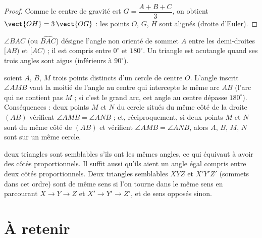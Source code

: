 \documentclass[11pt]{article}
\begin{document}
\begin{proof}
Comme le centre de gravité est $G=\dfrac{A+B+C}{3}$, on obtient $\vect{OH}=3\,\vect{OG}$ : les points $O$, $G$, $H$ sont alignés (droite d'Euler).
\end{proof}

\begin{definition}[Angles]\label{def:angles}
$\angle BAC$ (ou $\widehat{BAC}$) désigne l'angle non orienté de sommet $A$ entre les demi-droites $[AB)$ et $[AC)$ ; il est compris entre $0^\circ$ et $180^\circ$. Un triangle est acutangle quand ses trois angles sont aigus (inférieurs à $90^\circ$).
\end{definition}

\begin{theoreme}\label{thm:angle-inscrit}
soient $A$, $B$, $M$ trois points distincts d'un cercle de centre $O$. L'angle inscrit $\angle AMB$ vaut la moitié de l'angle au centre qui intercepte le même arc $AB$ (l'arc qui ne contient pas $M$ ; si c'est le grand arc, cet angle au centre dépasse $180^\circ$). Conséquences : deux points $M$ et $N$ du cercle situés du même côté de la droite $(AB)$ vérifient $\angle AMB=\angle ANB$ ; et, réciproquement, si deux points $M$ et $N$ sont du même côté de $(AB)$ et vérifient $\angle AMB=\angle ANB$, alors $A$, $B$, $M$, $N$ sont sur un même cercle.
\end{theoreme}

\begin{definition}\label{def:semblables}
deux triangles sont semblables s'ils ont les mêmes angles, ce qui équivaut à avoir des côtés proportionnels. Il suffit aussi qu'ils aient un angle égal compris entre deux côtés proportionnels. Deux triangles semblables $XYZ$ et $X'Y'Z'$ (sommets dans cet ordre) sont de même sens si l'on tourne dans le même sens en parcourant $X\to Y\to Z$ et $X'\to Y'\to Z'$, et de sens opposés sinon.
\end{definition}

\section{À retenir}\label{sec:retenir}
\end{document}
